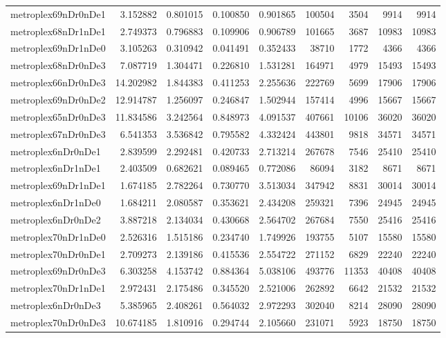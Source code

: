 \documentclass[../../../thesis.tex]{subfiles}
\begin{document}
\begin{longtable}{|l|r|r|r|r|r|r|r|r|}
metroplex69nDr0nDe1 & 3.152882 & 0.801015 & 0.100850 & 0.901865 & 100504 & 3504 & 9914 & 9914 \\
metroplex68nDr1nDe1 & 2.749373 & 0.796883 & 0.109906 & 0.906789 & 101665 & 3687 & 10983 & 10983 \\
metroplex69nDr1nDe0 & 3.105263 & 0.310942 & 0.041491 & 0.352433 & 38710 & 1772 & 4366 & 4366 \\
metroplex68nDr0nDe3 & 7.087719 & 1.304471 & 0.226810 & 1.531281 & 164971 & 4979 & 15493 & 15493 \\
metroplex66nDr0nDe3 & 14.202982 & 1.844383 & 0.411253 & 2.255636 & 222769 & 5699 & 17906 & 17906 \\
metroplex69nDr0nDe2 & 12.914787 & 1.256097 & 0.246847 & 1.502944 & 157414 & 4996 & 15667 & 15667 \\
metroplex65nDr0nDe3 & 11.834586 & 3.242564 & 0.848973 & 4.091537 & 407661 & 10106 & 36020 & 36020 \\
metroplex67nDr0nDe3 & 6.541353 & 3.536842 & 0.795582 & 4.332424 & 443801 & 9818 & 34571 & 34571 \\
metroplex6nDr0nDe1 & 2.839599 & 2.292481 & 0.420733 & 2.713214 & 267678 & 7546 & 25410 & 25410 \\
metroplex6nDr1nDe1 & 2.403509 & 0.682621 & 0.089465 & 0.772086 & 86094 & 3182 & 8671 & 8671 \\
metroplex69nDr1nDe1 & 1.674185 & 2.782264 & 0.730770 & 3.513034 & 347942 & 8831 & 30014 & 30014 \\
metroplex6nDr1nDe0 & 1.684211 & 2.080587 & 0.353621 & 2.434208 & 259321 & 7396 & 24945 & 24945 \\
metroplex6nDr0nDe2 & 3.887218 & 2.134034 & 0.430668 & 2.564702 & 267684 & 7550 & 25416 & 25416 \\
metroplex70nDr1nDe0 & 2.526316 & 1.515186 & 0.234740 & 1.749926 & 193755 & 5107 & 15580 & 15580 \\
metroplex70nDr0nDe1 & 2.709273 & 2.139186 & 0.415536 & 2.554722 & 271152 & 6829 & 22240 & 22240 \\
metroplex69nDr0nDe3 & 6.303258 & 4.153742 & 0.884364 & 5.038106 & 493776 & 11353 & 40408 & 40408 \\
metroplex70nDr1nDe1 & 2.972431 & 2.175486 & 0.345520 & 2.521006 & 262892 & 6642 & 21532 & 21532 \\
metroplex6nDr0nDe3 & 5.385965 & 2.408261 & 0.564032 & 2.972293 & 302040 & 8214 & 28090 & 28090 \\
metroplex70nDr0nDe3 & 10.674185 & 1.810916 & 0.294744 & 2.105660 & 231071 & 5923 & 18750 & 18750 \\

\end{longtable}
\end{document}
